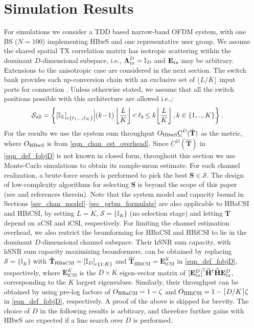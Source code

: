 \documentclass[journal,comsoc]{IEEEtran}
\begin{document}
\section{Simulation Results} \label{sec_sim_results}
For simulations we consider a TDD based narrow-band OFDM system, with one BS ($N=100$) implementing HBwS and one representative user group. We assume the shared spatial TX correlation matrix has isotropic scattering within the dominant $D$-dimensional subspace, i.e., $\boldsymbol{\Lambda}_{\rm tx}^{D} = \mathbb{I}_D$ and $\mathbf{E}_{\rm tx}$ may be arbitrary. Extensions to the anisotropic case are considered in the next section. 
The switch bank provides each up-conversion chain with an exclusive set of $\lfloor L/K \rfloor$ input ports for connection \cite{Gao2017}. Unless otherwise stated, we assume that all the switch positions possible with this architecture are allowed i.e.,: 
\begin{eqnarray} 
\mathcal{S}_{\rm all} = \left\{ {[\mathbb{I}_L]}_{{\rm c}\{\ell_1,..,\ell_K\}} \Big| (k\!-\! 1) \left\lfloor \frac{L}{K} \right\rfloor \! < \! \ell_k \! \leq k \! \left\lfloor \frac{L}{K} \right\rfloor, k \in \{1,..,K\} \right\}. \nonumber 
\end{eqnarray}
%
For the results we use the system sum throughput $O_{\rm HBwS}\underbar{C}^{D}(\hat{\mathbf{T}})$ as the metric, where $O_{\rm HBwS}$ is from \eqref{eqn_chan_est_overhead}. Since $\underbar{C}^{D}(\hat{\mathbf{T}})$ in \eqref{eqn_def_fobjD} is not known in closed form, throughout this section we use Monte-Carlo simulations to obtain its sample-mean estimate. For each channel realization, a brute-force search is performed to pick the best $\mathbf{S} \in \mathcal{S}$. The design of low-complexity algorithms for selecting $\mathbf{S}$ is beyond the scope of this paper (see \cite{Molisch_mag,Magazine_nosratinia} and references therein). 
%
%
Note that the system model and capacity bound in Sections \ref{sec_chan_model}--\ref{sec_prbm_formulate} are also applicable to HBaCSI and HBiCSI, by setting $L=K$, $\mathcal{S}=\{\mathbb{I}_K\}$ (no selection stage) and letting $\mathbf{T}$ depend on aCSI and iCSI, respectively. For limiting the channel estimation overhead, we also restrict the beamforming for HBaCSI and HBiCSI to lie in the dominant $D$-dimensional channel subspace. 
Their hSNR sum capacity, with hSNR sum capacity maximizing beamformers, can be obtained by replacing $\mathcal{S}=\{\mathbb{I}_K\}$ with $\hat{\mathbf{T}}_{\text{HBaCSI}} = {[\mathbb{I}_D]}_{{\rm c}\{1:K\}}$ and $\hat{\mathbf{T}}_{\text{HBiCSI}} = \mathbf{E}^{K}_{\text{iCSI}}$ in \eqref{eqn_def_fobjD}, respectively, where $\mathbf{E}^{K}_{\text{iCSI}}$ is the $D\times K$ eigen-vector matrix of ${[\mathbf{E}_{\rm tx}^{D}]}^{\dag} \widetilde{\mathbf{H}}^{\dag} \widetilde{\mathbf{H}} \mathbf{E}_{\rm tx}^{D}$, corresponding to the $K$ largest eigenvalues. 
Similarly, their throughput can be obtained by using pre-log factors of $O_{\rm HBaCSI} = 1 - \zeta$ and $O_{\rm HBiCSI} = 1 - \lceil D/K \rceil\zeta$ in \eqref{eqn_def_fobjD}, respectively. A proof of the above is skipped for brevity. The choice of $D$ in the following results is arbitrary, and therefore further gains with HBwS are expected if a line search over $D$ is performed.
\end{document}
